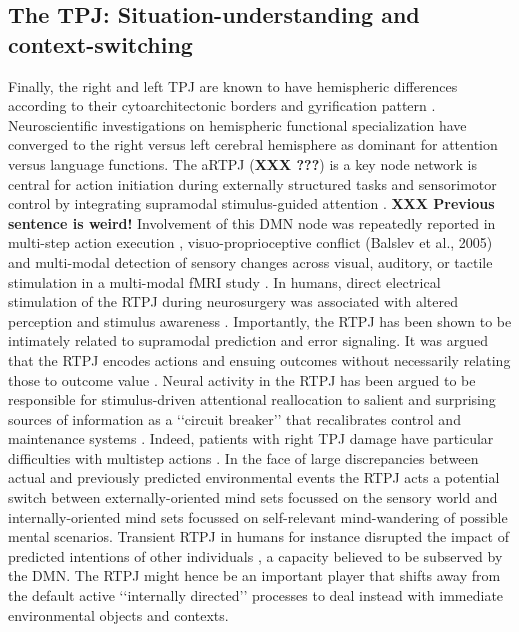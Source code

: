 \documentclass[10pt,letterpaper]{article}
\begin{document}
\subsection{The TPJ: Situation-understanding and context-switching}
Finally,
the right and left TPJ are known to have hemispheric differences
according to their cytoarchitectonic borders and gyrification pattern
\citep{seghier2013angular}.
Neuroscientific investigations on hemispheric functional specialization
have converged to the right versus left cerebral hemisphere as dominant for
attention versus language functions.
%
The aRTPJ (\textbf{XXX ???})  is a key node network is central for
action initiation during externally structured tasks and
sensorimotor control by integrating supramodal stimulus-guided attention
\citep{corbetta2002control}. \textbf{XXX Previous sentence is weird!}
Involvement of this DMN node was repeatedly reported in
multi-step action execution \citep{hartmann2005takes},
visuo-proprioceptive conflict (Balslev et al., 2005) and
multi-modal detection of sensory changes across
visual, auditory, or tactile stimulation in a multi-modal fMRI study
\citep{downar2000multimodal}.
In humans, direct electrical stimulation of the
RTPJ during neurosurgery was associated with altered perception
and stimulus awareness \citep{blanke2002neuropsychology}.
%
Importantly, the RTPJ has been shown to be intimately related to
supramodal prediction and error signaling.
It was argued that the RTPJ encodes actions and ensuing outcomes
without necessarily relating those to outcome value
\citep{liljeholm2013neural, hamilton2008action,
jakobs2009effects}.
Neural activity in the RTPJ has been argued to be responsible
for stimulus-driven attentional reallocation to
salient and surprising sources of information
as a ‘‘circuit breaker’’ that recalibrates control and maintenance systems
\citep{bzdok2013tpj, corbettashul2008}.
Indeed, patients with right TPJ damage have particular difficulties
with multistep actions \citep{hartmann2005takes}.
In the face of large discrepancies between actual and previously predicted
environmental events the RTPJ acts a potential switch between
externally-oriented mind sets focussed on the
sensory world and internally-oriented mind sets focussed
on self-relevant mind-wandering of possible mental scenarios.
Transient RTPJ in humans for instance disrupted the
impact of predicted intentions of other individuals
\citep{young2010disruption},
a capacity believed to be subserved by the DMN.
The RTPJ might hence be an important player that shifts away
from the default active ‘‘internally directed’’ processes
to deal instead with immediate environmental objects and contexts.
\end{document}
